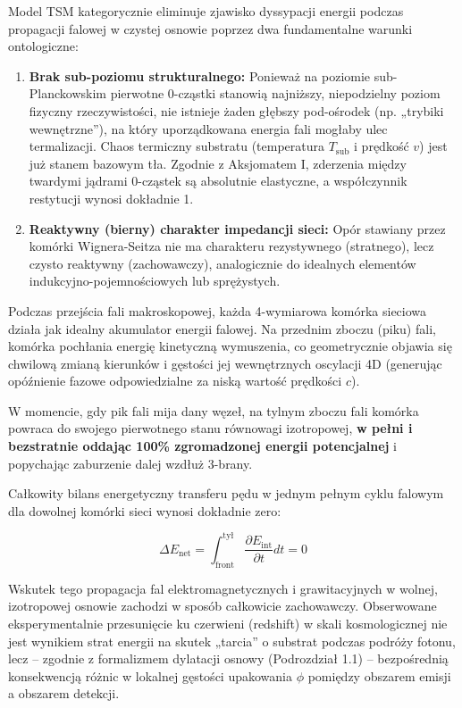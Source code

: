 \documentclass[
  letterpaper,
  DIV=11,
  numbers=noendperiod]{scrartcl}
\providecommand{\tightlist}{%
  \setlength{\itemsep}{0pt}\setlength{\parskip}{0pt}}
\numberwithin{equation}{subsection}
\begin{document}
Model TSM kategorycznie eliminuje zjawisko dyssypacji energii podczas
propagacji falowej w czystej osnowie poprzez dwa fundamentalne warunki
ontologiczne:

\begin{enumerate}
\def\labelenumi{\arabic{enumi}.}
\tightlist
\item
  \textbf{Brak sub-poziomu strukturalnego:} Ponieważ na poziomie
  sub-Planckowskim pierwotne 0-cząstki stanowią najniższy, niepodzielny
  poziom fizyczny rzeczywistości, nie istnieje żaden głębszy pod-ośrodek
  (np. „trybiki wewnętrzne''), na który uporządkowana energia fali
  mogłaby ulec termalizacji. Chaos termiczny substratu (temperatura
  \(T_{\text{sub}}\) i prędkość \(v\)) jest już stanem bazowym tła.
  Zgodnie z Aksjomatem I, zderzenia między twardymi jądrami 0-cząstek są
  absolutnie elastyczne, a współczynnik restytucji wynosi dokładnie 1.
\item
  \textbf{Reaktywny (bierny) charakter impedancji sieci:} Opór stawiany
  przez komórki Wignera-Seitza nie ma charakteru rezystywnego
  (stratnego), lecz czysto reaktywny (zachowawczy), analogicznie do
  idealnych elementów indukcyjno-pojemnościowych lub sprężystych.
\end{enumerate}

Podczas przejścia fali makroskopowej, każda 4-wymiarowa komórka sieciowa
działa jak idealny akumulator energii falowej. Na przednim zboczu (piku)
fali, komórka pochłania energię kinetyczną wymuszenia, co geometrycznie
objawia się chwilową zmianą kierunków i gęstości jej wewnętrznych
oscylacji 4D (generując opóźnienie fazowe odpowiedzialne za niską
wartość prędkości \(c\)).

W momencie, gdy pik fali mija dany węzeł, na tylnym zboczu fali komórka
powraca do swojego pierwotnego stanu równowagi izotropowej, \textbf{w
pełni i bezstratnie oddając 100\% zgromadzonej energii potencjalnej} i
popychając zaburzenie dalej wzdłuż 3-brany.

Całkowity bilans energetyczny transferu pędu w jednym pełnym cyklu
falowym dla dowolnej komórki sieci wynosi dokładnie zero:

\[\tag{1.2.06} \Delta E_{\text{net}} = \int_{\text{front}}^{\text{tył}} \frac{\partial E_{\text{int}}}{\partial t} dt = 0\]

Wskutek tego propagacja fal elektromagnetycznych i grawitacyjnych w
wolnej, izotropowej osnowie zachodzi w sposób całkowicie zachowawczy.
Obserwowane eksperymentalnie przesunięcie ku czerwieni (redshift) w
skali kosmologicznej nie jest wynikiem strat energii na skutek „tarcia''
o substrat podczas podróży fotonu, lecz -- zgodnie z formalizmem
dylatacji osnowy (Podrozdział 1.1) -- bezpośrednią konsekwencją różnic w
lokalnej gęstości upakowania \(\phi\) pomiędzy obszarem emisji a
obszarem detekcji.
\end{document}
